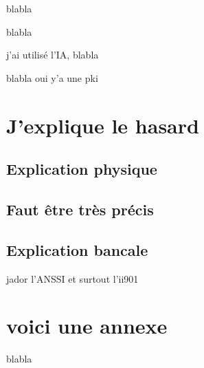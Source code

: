 \documentclass{INSAToulouse}
\begin{document}
    \makecover          %
    \makepagegarde      %

    blabla

    \clearpage

    blabla
    
    \clearpage

    j'ai utilisé l'IA, blabla
    \clearpage

    \makebackmatter     %
    \makeglossaire      %

    \clearpage
    
    \makesommaire       %

    blabla
    oui y'a une \gls{pki}

    \chapter{J'explique le hasard}
    \section{Explication physique}
    \section{Faut être très précis}
    \section{Explication bancale}
    jador l'ANSSI et surtout l'ii901\cite{ii901}
    


    \appendix
    \chapter{voici une annexe}
    blabla

    
    \clearpage
    \printbibliography[heading=bibintoc, title={Bibliographie}]
    
    \makebackcover      %
\end{document}
